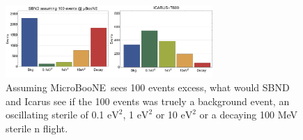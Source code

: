 \documentclass[11pt, a4paper]{article}
\def\muboone{MicroBooNE}
\begin{document}
	
\begin{figure}[t]
\center
\includegraphics[width=0.7\textwidth]{figures/baseline_comp.pdf}
\caption{\label{fig:baseline_comp} Assuming \muboone\ sees 100 events excess, what would SBND and Icarus see if the 100 events was truely a background event, an oscillating sterile of 0.1 $\text{eV}^2$, 1  $\text{eV}^2$ or 10 $\text{eV}^2$ or a decaying 100 MeV sterile n flight. }
\end{figure}




{}
\end{document}
